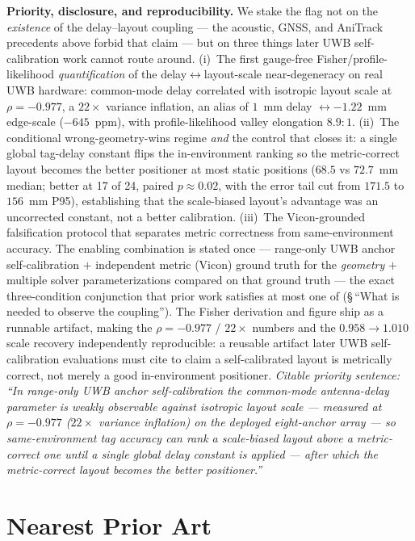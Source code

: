 \documentclass[11pt,a4paper]{article}
\begin{document}
\textbf{Priority, disclosure, and reproducibility.} We stake the flag not on the \emph{existence} of
the delay--layout coupling --- the acoustic, GNSS, and AniTrack precedents above forbid that claim ---
but on three things later UWB self-calibration work cannot route around. (i)~The first gauge-free
Fisher/profile-likelihood \emph{quantification} of the delay$\leftrightarrow$layout-scale
near-degeneracy on real UWB hardware: common-mode delay correlated with isotropic layout scale at
$\rho=-0.977$, a $22\times$ variance inflation, an alias of $1$~mm delay $\leftrightarrow -1.22$~mm
edge-scale ($-645$~ppm), with profile-likelihood valley elongation $8.9{:}1$. (ii)~The conditional
wrong-geometry-wins regime \emph{and} the control that closes it: a single global tag-delay constant
flips the in-environment ranking so the metric-correct layout becomes the better positioner at most
static positions ($68.5$ vs $72.7$~mm median; better at 17 of 24, paired $p\approx0.02$, with the error
tail cut from $171.5$ to $156$~mm P95), establishing
that the scale-biased layout's advantage was an uncorrected constant, not a better calibration.
(iii)~The Vicon-grounded falsification protocol that separates metric correctness from same-environment
accuracy. The enabling combination is stated once ---
range-only UWB anchor self-calibration $+$ independent metric (Vicon) ground truth for the
\emph{geometry} $+$ multiple solver parameterizations compared on that ground truth --- the exact
three-condition conjunction that prior work satisfies at most one of (\S\,``What is needed to observe
the coupling''). The Fisher derivation and figure ship as a runnable artifact, making the $\rho=-0.977$ / $22\times$ numbers
and the $0.958\!\to\!1.010$ scale recovery independently reproducible: a reusable artifact later UWB
self-calibration evaluations must cite to claim a self-calibrated layout is metrically correct, not
merely a good in-environment positioner. \emph{Citable priority sentence:}
\emph{``In range-only UWB anchor self-calibration the common-mode antenna-delay parameter is weakly
observable against isotropic layout scale --- measured at $\rho=-0.977$ ($22\times$ variance
inflation) on the deployed eight-anchor array --- so
same-environment tag accuracy can rank a scale-biased layout above a metric-correct one until a single
global delay constant is applied --- after which the metric-correct layout becomes the better positioner.''}

\section{Nearest Prior Art}
\end{document}

